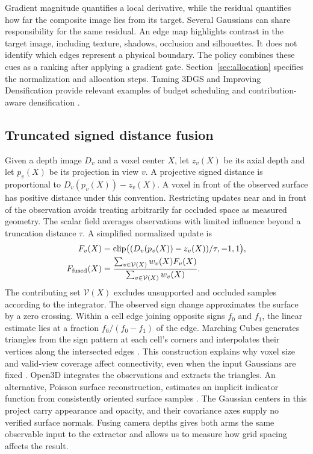 Gradient magnitude quantifies a local derivative, while the residual quantifies how far the composite image lies from its target. Several Gaussians can share responsibility for the same residual. An edge map highlights contrast in the target image, including texture, shadows, occlusion and silhouettes. It does not identify which edges represent a physical boundary. The policy combines these cues as a ranking after applying a gradient gate. Section~\ref{sec:allocation} specifies the normalization and allocation steps. Taming 3DGS and Improving Densification provide relevant examples of budget scheduling and contribution-aware densification \cite{ref12,ref7}.

\subsection{Truncated signed distance fusion}
Given a depth image $D_v$ and a voxel center $X$, let $z_v(X)$ be its axial depth and let $p_v(X)$ be its projection in view $v$. A projective signed distance is proportional to $D_v(p_v(X))-z_v(X)$. A voxel in front of the observed surface has positive distance under this convention. Restricting updates near and in front of the observation avoids treating arbitrarily far occluded space as measured geometry. The scalar field averages observations with limited influence beyond a truncation distance $\tau$. A simplified normalized update is
\begin{align}
 F_v(X)&=\mathrm{clip}\bigl((D_v(p_v(X))-z_v(X))/\tau,-1,1\bigr),\\
 F_{\rm fused}(X)&=\frac{\sum_{v\in\mathcal V(X)}w_v(X)F_v(X)}
                         {\sum_{v\in\mathcal V(X)}w_v(X)} .
\end{align}
The contributing set $\mathcal V(X)$ excludes unsupported and occluded samples according to the integrator. The observed sign change approximates the surface by a zero crossing. Within a cell edge joining opposite signs $f_0$ and $f_1$, the linear estimate lies at a fraction $f_0/(f_0-f_1)$ of the edge. Marching Cubes generates triangles from the sign pattern at each cell's corners and interpolates their vertices along the intersected edges \cite{ref14}. This construction explains why voxel size and valid-view coverage affect connectivity, even when the input Gaussians are fixed \cite{ref9}. Open3D integrates the observations and extracts the triangles. An alternative, Poisson surface reconstruction, estimates an implicit indicator function from consistently oriented surface samples \cite{ref15}. The Gaussian centers in this project carry appearance and opacity, and their covariance axes supply no verified surface normals. Fusing camera depths gives both arms the same observable input to the extractor and allows us to measure how grid spacing affects the result.

